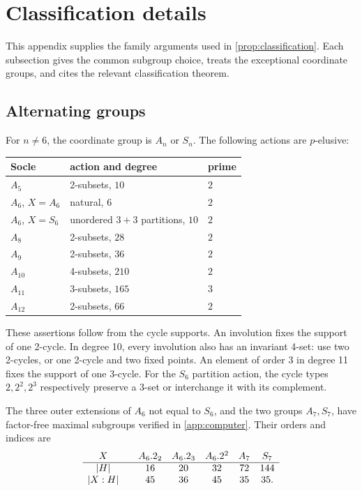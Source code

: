 \documentclass[11pt]{amsart}
\theoremstyle{definition}
\begin{document}
\appendix
\section{Classification details}\label{app:classification}

This appendix supplies the family arguments used in
\cref{prop:classification}.  Each subsection gives the common subgroup
choice, treats the exceptional coordinate groups, and cites the relevant
classification theorem.

\subsection{Alternating groups}\label{app:alternating}

For \(n\ne6\), the coordinate group is \(A_n\) or \(S_n\).  The following
actions are \(p\)-elusive:
\begin{center}
\begin{tabular}{lll}
\toprule
Socle & action and degree & prime \\
\midrule
\(A_5\) & 2-subsets, \(10\) & \(2\) \\
\(A_6\), \(X=A_6\) & natural, \(6\) & \(2\) \\
\(A_6\), \(X=S_6\) & unordered \(3+3\) partitions, \(10\) & \(2\) \\
\(A_8\) & 2-subsets, \(28\) & \(2\) \\
\(A_9\) & 2-subsets, \(36\) & \(2\) \\
\(A_{10}\) & 4-subsets, \(210\) & \(2\) \\
\(A_{11}\) & 3-subsets, \(165\) & \(3\) \\
\(A_{12}\) & 2-subsets, \(66\) & \(2\) \\
\bottomrule
\end{tabular}
\end{center}
These assertions follow from the cycle supports.  An involution fixes the
support of one 2-cycle.  In degree 10, every involution also has an invariant
4-set: use two 2-cycles, or one 2-cycle and two fixed points.  An element of
order 3 in degree 11 fixes the support of one 3-cycle.  For the \(S_6\)
partition action, the cycle types \(2,2^2,2^3\) respectively preserve a
3-set or interchange it with its complement.

The three outer extensions of \(A_6\) not equal to \(S_6\), and the two
groups \(A_7,S_7\), have factor-free maximal subgroups verified in
\cref{app:computer}.  Their orders and indices are
\[
\begin{array}{c@{\qquad}ccccc}
X&A_6.2_2&A_6.2_3&A_6.2^2&A_7&S_7\\ \hline
\lvert H\rvert&16&20&32&72&144\\
{\lvert X:H\rvert}&45&36&45&35&35.\\
\end{array}
\]
\end{document}
